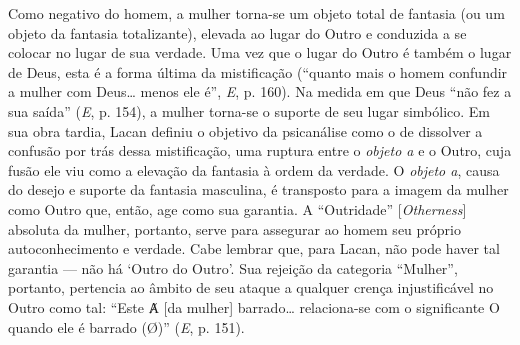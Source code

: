 Como negativo do homem, a mulher torna-se um objeto total de fantasia
(ou um objeto da fantasia totalizante), elevada ao lugar do Outro e
conduzida a se colocar no lugar de sua verdade. Uma vez que o lugar do
Outro é também o lugar de Deus, esta é a forma última da mistificação
(``quanto mais o homem confundir a mulher com Deus\ldots{} menos ele é'',
\emph{E}, p. 160). Na medida em que Deus ``não fez a sua saída''
(\emph{E}, p. 154), a mulher torna-se o suporte de seu lugar simbólico.
Em sua obra tardia, Lacan definiu o objetivo da psicanálise como o de
dissolver a confusão por trás dessa mistificação, uma ruptura entre o
\emph{objeto a} e o Outro, cuja fusão ele viu como a elevação da
fantasia à ordem da verdade. O \emph{objeto a}, causa do desejo e
suporte da fantasia masculina, é transposto para a imagem da mulher como
Outro que, então, age como sua garantia. A ``Outridade''
{[}\emph{Otherness}{]} absoluta da mulher, portanto, serve para
assegurar ao homem seu próprio autoconhecimento e verdade. Cabe lembrar
que, para Lacan, não pode haver tal garantia --- não há `Outro do Outro'.
Sua rejeição da categoria ``Mulher'', portanto, pertencia ao âmbito de
seu ataque a qualquer crença injustificável no Outro como tal: ``Este Ⱥ
{[}da mulher{]} barrado\ldots{} relaciona-se com o significante O quando ele
é barrado (Ø)'' (\emph{E}, p. 151).

